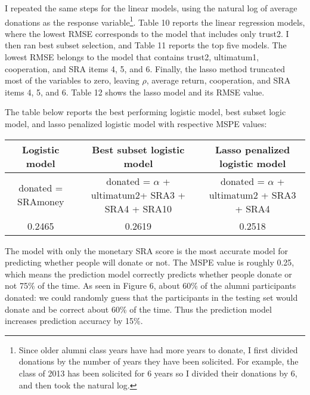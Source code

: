 \documentclass[12pt]{article}
\begin{document}
I repeated the same steps for the linear models, using the natural log of average donations as the response variable\footnote{Since older alumni class years have had more years to donate, I first divided donations by the number of years they have been solicited. For example, the class of 2013 has been solicited for 6 years so I divided their donations by 6, and then took the natural log.}. Table 10 reports the linear regression models, where the lowest RMSE corresponds to the model that includes only trust2. I then ran best subset selection, and Table 11 reports the top five models. The lowest RMSE belongs to the model that contains trust2, ultimatum1, cooperation, and SRA items 4, 5, and 6. Finally, the lasso method truncated most of the variables to zero, leaving \(\rho\), average return, cooperation, and SRA items 4, 5, and 6. Table 12 shows the lasso model and its RMSE value.


The table below reports the best performing logistic model, best subset logic model, and lasso penalized logistic model with respective MSPE values:

\vspace{6mm} \begin{adjustbox}{width=\textwidth}
\begin{tabular}{ c | c | c }
\hline \hline
Logistic model & Best subset logistic model & Lasso penalized logistic model \\ 
\hline
\small donated = SRAmoney & donated = \(\alpha\) + ultimatum2+ SRA3 + SRA4 + SRA10 & donated = \(\alpha\) + ultimatum2 + SRA3 + SRA4 \\
 \hline
 0.2465 & 0.2619 & 0.2518 \\  
 \hline \hline
\end{tabular}
\end{adjustbox}

\vspace{4mm} The model with only the monetary SRA score is the most accurate model for predicting whether people will donate or not. The MSPE value is roughly 0.25, which means the prediction model correctly predicts whether people donate or not 75\% of the time. As seen in Figure 6, about 60\% of the alumni participants donated: we could randomly guess that the participants in the testing set would donate and be correct about 60\% of the time. Thus the prediction model increases prediction accuracy by 15\%.
 
\end{document}
